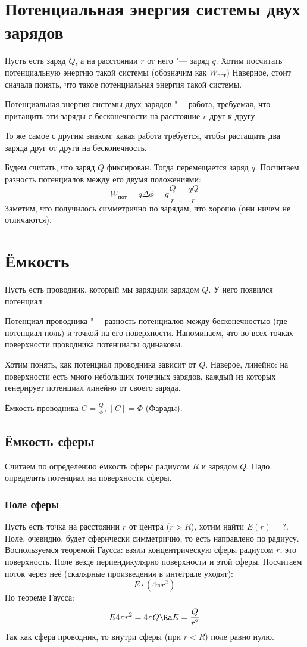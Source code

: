 \section{Потенциальная энергия системы двух зарядов}
  Пусть есть заряд $Q$, а на расстоянии $r$ от него "--- заряд $q$.
  Хотим посчитать потенциальную энергию такой системы (обозначим как $W_{пот}$)
  Наверное, стоит сначала понять, что такое потенциальная энергия такой системы.
  \begin{Def}
    Потенциальная энергия системы двух зарядов "--- работа, требуемая, что притащить
    эти заряды с бесконечности на расстояние $r$ друг к другу.
  \end{Def}
  \begin{Rem}
    То же самое с другим знаком: какая работа требуется, чтобы растащить два заряда друг от друга на бесконечность.
  \end{Rem}
  Будем считать, что заряд $Q$ фиксирован.
  Тогда перемещается заряд $q$.
  Посчитаем разность потенциалов между его двумя положениями:
  \[W_{пот} = q \Delta \phi = q \frac{Q} r = \frac{qQ}{r}\]
  Заметим, что получилось симметрично по зарядам, что хорошо (они ничем не отличаются).

\section{Ёмкость}
  Пусть есть проводник, который мы зарядили зарядом $Q$.
  У него появился потенциал.
  \begin{Def}
    Потенциал проводника "--- разность потенциалов между бесконечностью (где потенциал ноль) и точкой на его поверхности.
    Напоминаем, что во всех точках поверхности проводника потенциалы одинаковы.
  \end{Def}
  Хотим понять, как потенциал проводника зависит от $Q$.
  Наверое, линейно: на поверхности есть много небольших точечных зарядов, каждый из которых генерирует потенциал линейно от своего заряда.
  \begin{Def}
    Ёмкость проводника $C=\frac{Q}{\phi}$, $[C]=\Phi$ (Фарады).
  \end{Def}

  \subsection{Ёмкость сферы}
    Считаем по определению ёмкость сферы радиусом $R$ и зарядом $Q$.
    Надо определить потенциал на поверхности сферы.
    \subsubsection{Поле сферы}
      Пусть есть точка на расстоянии $r$ от центра ($r>R$), хотим найти $E(r)=?$.
      Поле, очевидно, будет сферически симметрично, то есть направлено по радиусу.
      Воспользуемся теоремой Гаусса: взяли концентрическую сферы радиусом $r$, это поверхность.
      Поле везде перпендикулярно поверхности и этой сферы.
      Посчитаем поток через неё (скалярные произведения в интеграле уходят):
      \[E \cdot (4\pi r^2)\]
      По теореме Гаусса:
      \[E 4 \pi r^2 = 4\pi Q \Ra E = \frac{Q}{r^2}\]
      Так как сфера проводник, то внутри сферы (при $r<R$) поле равно нулю.
